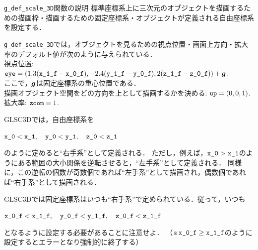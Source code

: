 \documentclass[platex,a4paper,12pt]{jsarticle}%
\def\Vec#1{\mbox{\boldmath $#1$}}
\begin{document}
\begin{itembox}[l]{\texttt{g\_def\_scale\_3D}関数の説明}
標準座標系上に三次元のオブジェクトを描画するための描画枠・描画するための固定座標系・オブジェクトが定義される自由座標系を設定する．

\verb|g_def_scale_3D|では，オブジェクトを見るための視点位置・画面上方向・拡大率のデフォルト値が次のように与えられている．\\
視点位置: $\verb|eye| = (1.3(\verb|x_1_f|-\verb|x_0_f|), -2.4(\verb|y_1_f|-\verb|y_0_f|), 2(\verb|z_1_f|-\verb|z_0_f|)) + \Vec{g}$. \\
ここで，$\Vec{g}$は固定座標系の重心位置である．\\
描画オブジェクト空間をどの方向を上として描画するかを決める: $\verb|up| = (0, 0, 1)$. \\
拡大率: $\verb|zoom| = 1$. 

GLSC3Dでは，自由座標系を\begin{center}{$\verb|x_0| < \verb|x_1|,\quad \verb|y_0| < \verb|y_1|,\quad \verb|z_0| < \verb|z_1|$}\end{center}のように定めると``右手系''として定義される．
ただし，例えば，$\verb|x_0| > \verb|x_1|$のようにある範囲の大小関係を逆転させると，``左手系''として定義される．
同様に，この逆転の個数が奇数個であれば``左手系''として描画され，偶数個であれば``右手系''として描画される．

GLSC3Dでは固定座標系はいつも``右手系''で定められている．従って，いつも\begin{center}{$\verb|x_0_f| < \verb|x_1_f|,\quad \verb|y_0_f| < \verb|y_1_f|, \quad \verb|z_0_f| < \verb|z_1_f|$}\end{center}となるように設定する必要があることに注意せよ．
（※$\verb|x_0_f| \geq \verb|x_1_f|$のように設定するとエラーとなり強制的に終了する）
\end{itembox}
\end{document}
